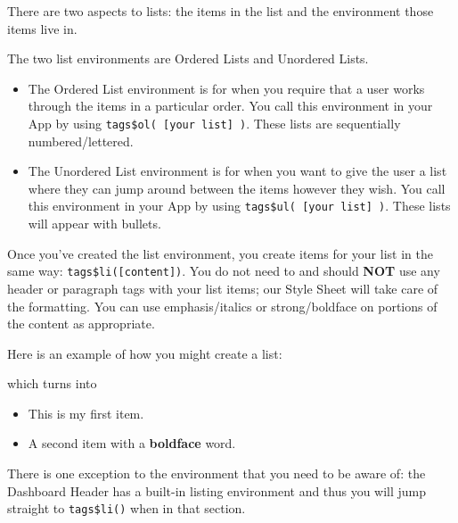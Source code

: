 \documentclass[
]{book}
\newenvironment{Shaded}{\begin{snugshade}}{\end{snugshade}}
\newcommand{\KeywordTok}[1]{\textcolor[rgb]{0.13,0.29,0.53}{\textbf{#1}}}
\newcommand{\NormalTok}[1]{#1}
\newcommand{\OperatorTok}[1]{\textcolor[rgb]{0.81,0.36,0.00}{\textbf{#1}}}
\newcommand{\StringTok}[1]{\textcolor[rgb]{0.31,0.60,0.02}{#1}}
\providecommand{\tightlist}{%
  \setlength{\itemsep}{0pt}\setlength{\parskip}{0pt}}
\begin{document}
There are two aspects to lists: the items in the list and the environment those items live in.

The two list environments are Ordered Lists and Unordered Lists.

\begin{itemize}
\tightlist
\item
  The Ordered List environment is for when you require that a user works through the items in a particular order. You call this environment in your App by using \texttt{tags\$ol(\ {[}your\ list{]}\ )}. These lists are sequentially numbered/lettered.
\item
  The Unordered List environment is for when you want to give the user a list where they can jump around between the items however they wish. You call this environment in your App by using \texttt{tags\$ul(\ {[}your\ list{]}\ )}. These lists will appear with bullets.
\end{itemize}

Once you've created the list environment, you create items for your list in the same way: \texttt{tags\$li({[}content{]})}. You do not need to and should \textbf{NOT} use any header or paragraph tags with your list items; our Style Sheet will take care of the formatting. You can use emphasis/italics or strong/boldface on portions of the content as appropriate.

Here is an example of how you might create a list:

\begin{Shaded}
\end{Shaded}

which turns into

\begin{itemize}
\tightlist
\item
  This is my first item.
\item
  A second item with a \textbf{boldface} word.
\end{itemize}

There is one exception to the environment that you need to be aware of: the Dashboard Header has a built-in listing environment and thus you will jump straight to \texttt{tags\$li()} when in that section.
\end{document}
